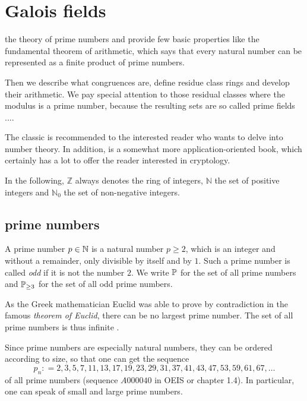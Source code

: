\section{Galois fields}

the theory of prime numbers and provide few basic properties like the fundamental theorem of arithmetic, which says that every natural number can be represented as a finite product of prime numbers.

Then we describe what congruences are, define residue class rings and develop their arithmetic. We pay special attention to those residual classes where the modulus is a prime number, because the resulting sets are so called prime fields ....
 
The classic \cite{HW} is recommended to the interested reader who wants to delve into number theory. In addition, \cite{FO} is a somewhat more application-oriented book, which certainly has a lot to offer the reader interested in cryptology.
 
In the following, $\mathbb{Z} $ always denotes the ring of integers, $\mathbb{N}$ the set of positive integers and $\mathbb{N}_0$ the set of non-negative integers.

\subsection{prime numbers}
A prime number $ p \in \mathbb{N} $ is a natural number $ p \geq 2 $, which is an integer and without a remainder, only divisible by itself and by $ 1 $. Such a prime number is called \textit{odd} if it is not the number $ 2 $. We write $ \mathbb{P} $ for the set of all prime numbers and $ \mathbb{P} _{\geq 3} $ for the set of all odd prime numbers.

As the Greek mathematician Euclid was able to prove by contradiction in the famous \textit{theorem of Euclid}, there can be no largest prime number. The set of all prime numbers is thus infinite \cite{AL}.

Since prime numbers are especially natural numbers, they can be ordered according to size, so that one can get the sequence
\begin{equation}
\label{eq: primenumber_sequence}
p_n: = 2, 3, 5, 7, 11, 13, 17, 19, 23, 29, 31, 37, 41, 43, 47, 53, 59, 61, 67, \ldots
\end{equation}
of all prime numbers (sequence $ A000040 $ in OEIS or \cite{HW} chapter 1.4). In particular, one can speak of small and large prime numbers.

